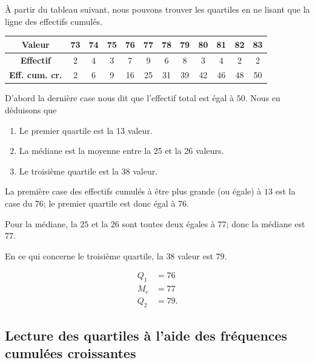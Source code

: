   \begin{example}

À partir du tableau suivant, nous pouvons trouver les quartiles en ne lisant que la ligne des effectifs cumulés.

  \begin{center}
\begin{tabular}[h]{|c||c|c|c|c|c|c|c|c|c|c|c|}
    \hline
  \textbf{Valeur} & 73 & 74 & 75 & 76 & 77 & 78 & 79 & 80 & 81 & 82 & 83 \\
  \hline
  \textbf{Effectif} & 2 & 4 & 3 & 7 & 9 & 6 & 8 & 3 & 4 & 2 & 2 \\ 
  \hline
  \textbf{Eff. cum. cr.} & 2 & 6 & 9 & 16 & 25 & 31 & 39 & 42 & 46 & 48 & 50 \\ 
  \hline
\end{tabular}
      
  \end{center}

D'abord la dernière case nous dit que l'effectif total est égal à \( 50\). Nous en déduisons que
\begin{enumerate}
  \item Le premier quartile est la 13 valeur.
  \item La médiane est la moyenne entre la 25 et la 26 valeurs.
  \item Le troisième quartile est la 38 valeur.
\end{enumerate}
La première case des effectifs cumulés à être plus grande (ou égale) à \( 13\) est la case du \( 76\); le premier quartile est donc égal à \( 76\).

Pour la médiane, la \( 25\) et la \( 26\) sont toutes deux égales à \( 77\); donc la médiane est \( 77\).

En ce qui concerne le troisième quartile, la \( 38\) valeur est \( 79\).

\begin{subequations}
    \begin{align}
        Q_1&=76\\
        M_e&=77\\
        Q_2&=79.
    \end{align}
\end{subequations}
  \end{example}

\subsection{Lecture des quartiles à l'aide des fréquences cumulées croissantes}

